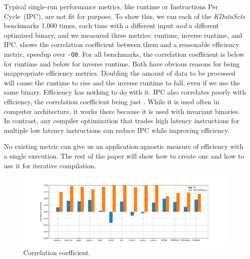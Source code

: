     Typical single-run performance metrics, like runtime or Instructions Per Cycle~(IPC), are not fit for purpose. To show this, we ran
    each of the  \textit{KDataSets} benchmarks 1,000 times, each time with a different input \textit{and} a different optimized
    binary, and we measured three metrics: runtime, inverse runtime, and IPC.  shows the correlation coefficient between
    them and a reasonable efficiency metric, speedup over \texttt{-O0}. For all benchmarks, the correlation coefficient is below
     for runtime and below  for inverse runtime. Both have obvious reasons for being inappropriate efficiency
    metrics. Doubling the amount of data to be processed will cause the runtime to rise and the inverse runtime to fall, even if we use the same binary.
    Efficiency has nothing to do with it. IPC also correlates poorly with efficiency, the correlation coefficient being just .
    While it is used often in computer architecture, it works there because it is used with invariant binaries. In contrast, any compiler
    optimization that trades high latency instructions for multiple low latency instructions can reduce IPC while improving efficiency.
    
    No existing metric can give us an application-agnostic measure of efficiency with a single execution. The rest of the paper will show
    how to create one and how to use it for iterative compilation. 

    

\begin{figure}[t]
    \centering
    \includegraphics[width=\textwidth]{figs/corr_coeff.pdf}
    \caption{Correlation coefficient.}
    \label{fig:corr_coeff}
\end{figure}

